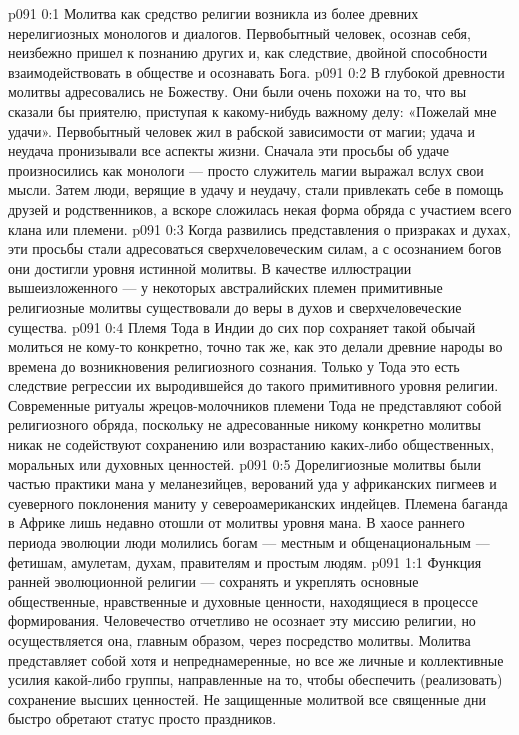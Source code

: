 \author{Глава Срединников}
\vs p091 0:1 Молитва как средство религии возникла из более древних нерелигиозных монологов и диалогов. Первобытный человек, осознав себя, неизбежно пришел к познанию других и, как следствие, двойной способности взаимодействовать в обществе и осознавать Бога.
\vs p091 0:2 В глубокой древности молитвы адресовались не Божеству. Они были очень похожи на то, что вы сказали бы приятелю, приступая к какому\hyp{}нибудь важному делу: «Пожелай мне удачи». Первобытный человек жил в рабской зависимости от магии; удача и неудача пронизывали все аспекты жизни. Сначала эти просьбы об удаче произносились как монологи --- просто служитель магии выражал вслух свои мысли. Затем люди, верящие в удачу и неудачу, стали привлекать себе в помощь друзей и родственников, а вскоре сложилась некая форма обряда с участием всего клана или племени.
\vs p091 0:3 Когда развились представления о призраках и духах, эти просьбы стали адресоваться сверхчеловеческим силам, а с осознанием богов они достигли уровня истинной молитвы. В качестве иллюстрации вышеизложенного --- у некоторых австралийских племен примитивные религиозные молитвы существовали до веры в духов и сверхчеловеческие существа.
\vs p091 0:4 Племя Тода в Индии до сих пор сохраняет такой обычай молиться не кому\hyp{}то конкретно, точно так же, как это делали древние народы во времена до возникновения религиозного сознания. Только у Тода это есть следствие регрессии их выродившейся до такого примитивного уровня религии. Современные ритуалы жрецов\hyp{}молочников племени Тода не представляют собой религиозного обряда, поскольку не адресованные никому конкретно молитвы никак не содействуют сохранению или возрастанию каких\hyp{}либо общественных, моральных или духовных ценностей.
\vs p091 0:5 Дорелигиозные молитвы были частью практики мана у меланезийцев, верований уда у африканских пигмеев и суеверного поклонения маниту у североамериканских индейцев. Племена баганда в Африке лишь недавно отошли от молитвы уровня мана. В хаосе раннего периода эволюции люди молились богам --- местным и общенациональным --- фетишам, амулетам, духам, правителям и простым людям.
\vs p091 1:1 Функция ранней эволюционной религии --- сохранять и укреплять основные общественные, нравственные и духовные ценности, находящиеся в процессе формирования. Человечество отчетливо не осознает эту миссию религии, но осуществляется она, главным образом, через посредство молитвы. Молитва представляет собой хотя и непреднамеренные, но все же личные и коллективные усилия какой\hyp{}либо группы, направленные на то, чтобы обеспечить (реализовать) сохранение высших ценностей. Не защищенные молитвой все священные дни быстро обретают статус просто праздников.
